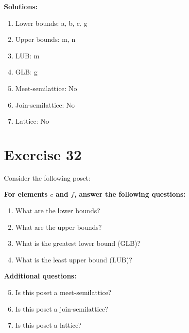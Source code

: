 \documentclass{article}
\begin{document}
\textbf{Solutions:}
\begin{enumerate}
    \item Lower bounds: {a, b, c, g}
    \item Upper bounds: {m, n}
    \item LUB: m
    \item GLB: g
    \item Meet-semilattice: No
    \item Join-semilattice: No
    \item Lattice: No
\end{enumerate}
\newpage
\section*{Exercise 32}
Consider the following poset:
\begin{center}
\end{center}

    \textbf{For elements $c$ and $f$, answer the following questions:}
\begin{enumerate}
    \item What are the lower bounds?
    \item What are the upper bounds?
    \item What is the greatest lower bound (GLB)?
    \item What is the least upper bound (LUB)?
\end{enumerate}
    \hspace*{3ex} \textbf{Additional questions:}
\begin{enumerate}
    \setcounter{enumi}{4}
    \item Is this poset a meet-semilattice?
    \item Is this poset a join-semilattice?
    \item Is this poset a lattice?
\end{enumerate}
\end{document}
